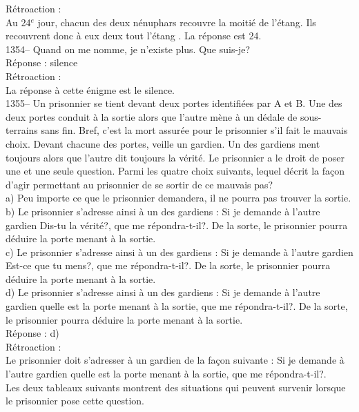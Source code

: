 ﻿\documentclass[letterpaper, 12pt]{article}
\begin{document}
R\'etroaction : \\
Au 24$^e$ jour, chacun des deux n\'enuphars recouvre la moiti\'e de
l'\'etang.  Ils recouvrent donc \`a eux deux tout l'\'etang . La r\'eponse
est 24.  \\

1354-- Quand on me nomme, je n'existe plus.  Que suis-je?\\

R\'eponse : silence\\

R\'etroaction : \\
La r\'eponse \`a cette \'enigme est le silence.\\

1355-- Un prisonnier se tient devant deux portes identifi\'ees par A et B.
Une des deux portes conduit \`a la sortie alors que l'autre m\`ene \`a un
d\'edale de sous-terrains sans fin.  Bref, c'est la mort assur\'ee pour le
prisonnier s'il fait le mauvais choix. Devant chacune des portes, veille un
gardien.  Un des gardiens ment toujours alors que l'autre dit toujours la
v\'erit\'e.  Le prisonnier a le droit de poser une et une seule question.
Parmi les quatre choix suivants, lequel d\'ecrit la fa\c con d'agir
permettant au prisonnier de se sortir de ce mauvais pas?\\
a) Peu importe ce que le prisonnier demandera, il ne pourra pas trouver la
sortie.\\
b) Le prisonnier s'adresse ainsi \`a un des gardiens : \og Si je
demande \`a l'autre gardien \og Dis-tu la v\'erit\'e?\fg , que me
r\'epondra-t-il?\fg . De la
sorte, le prisonnier pourra d\'eduire la porte menant \`a la sortie.\\
c) Le prisonnier s'adresse ainsi \`a un des gardiens : \og Si je
demande \`a l'autre gardien \og Est-ce que tu mens?\fg , que me
r\'epondra-t-il?\fg . De la
sorte, le prisonnier pourra d\'eduire la porte menant \`a la sortie.\\
d) Le prisonnier s'adresse ainsi \`a un des gardiens : \og Si je
demande \`a l'autre gardien quelle est la porte menant \`a la
sortie, que me r\'epondra-t-il?\fg . De la sorte, le prisonnier
pourra d\'eduire la porte
menant \`a la sortie.\\

R\'eponse : d)\\

R\'etroaction : \\
Le prisonnier doit s'adresser \`a un gardien de la fa\c con suivante
: \og Si je demande \`a l'autre gardien
quelle est la porte menant \`a la sortie, que me r\'epondra-t-il?\fg .\\
Les deux tableaux suivants montrent des situations qui peuvent survenir
lorsque le prisonnier pose cette question.  \\
\end{document}
